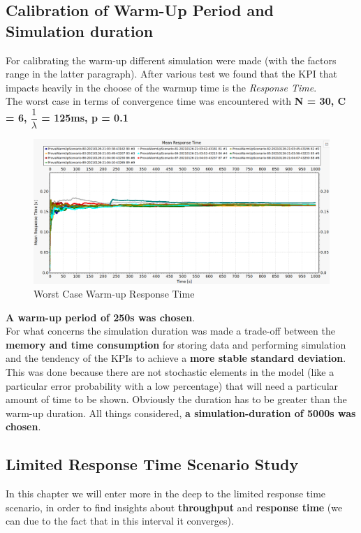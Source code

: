 \subsection{Calibration of Warm-Up Period and Simulation duration}
For calibrating the warm-up different simulation were made (with the factors range in the latter paragraph). After various test we found that the KPI that impacts heavily in the choose of the warmup time is the \textit{Response Time}.\\
The worst case in terms of convergence time was encountered with \textbf{N = 30, C = 6, $\dfrac{1}{\lambda}$ = 125ms, p = 0.1 }
\begin{figure}[H]
	\centering
	\includegraphics[width=\textwidth]{img/warmup.png}
	\caption{Worst Case Warm-up Response Time}
	\label {img: warmUp}
\end{figure}  

\noindent\textbf{A warm-up period of 250s was chosen}.\\
For what concerns the simulation duration was made a trade-off between the \textbf{memory and time consumption} for storing data and performing simulation and the tendency of the KPIs to achieve a \textbf{more stable standard deviation}. This was done because there are not stochastic elements in the model (like a particular error probability with a low percentage) that will need a particular amount of time to be shown. Obviously the duration has to be greater than the warm-up duration. All things considered, \textbf{a simulation-duration of 5000s was chosen}.

\subsection{Limited Response Time Scenario Study}
In this chapter we will enter more in the deep to the limited response time scenario, in order to find insights about \textbf{throughput} and \textbf{response time} (we can due to the fact that in this interval it converges).
